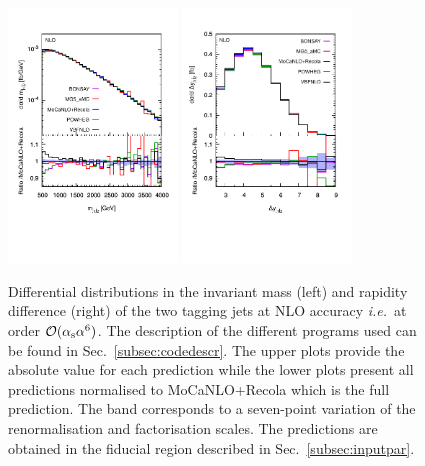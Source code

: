 \documentclass[twocolumn,epjc3]{svjour3} %
\newlength{\width}
\begin{document}
     \begin{figure}
       \centering
       \includegraphics[width=0.4\textwidth,angle=0,clip=true,trim={0.4cm 2cm 0.cm 1.cm}]{figures/NLO/mjj_NLO.pdf}
       \includegraphics[width=0.4\textwidth,angle=0,clip=true,trim={0.4cm 2cm 0.cm 1.cm}]{figures/NLO/dyj1j2_NLO.pdf}
    \caption{\label{fig:distNLO1} Differential distributions in the invariant mass (left) and rapidity difference (right) of the two tagging jets at NLO accuracy \emph{i.e.}\ at order $\mathcal{O}(\alpha_{\rm s}\alpha^6)$.
    The description of the different programs used can be found in Sec.~\protect\ref{subsec:codedescr}.
    The upper plots provide the absolute value for each prediction while the lower plots present all predictions normalised to {\sc MoCaNLO}+{\sc Recola} which is the full prediction.
    The band corresponds to a seven-point variation of the renormalisation and factorisation scales.
    The predictions are obtained in the fiducial region described in Sec.~\protect\ref{subsec:inputpar}.
    }
    \end{figure}
\end{document}
